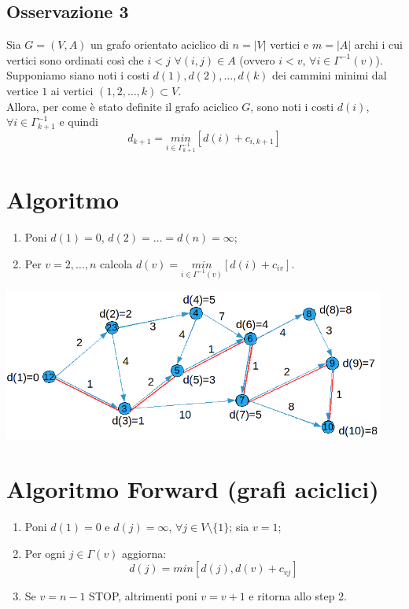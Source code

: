 \subsection{Osservazione 3}
Sia $G=(V,A)$ un grafo orientato aciclico di $n=|V|$ vertici e $m=|A|$ archi i cui vertici sono ordinati così che $i<j$ $\forall(i,j)\in A$ (ovvero $i<v$, $\forall i\in\Gamma^{-1}(v)$).\\
Supponiamo siano noti i costi $d(1),d(2),\dots,d(k)$ dei cammini minimi dal vertice $1$ ai vertici $(1,2,\dots,k)\subset V$.\\
Allora, per come è stato definite il grafo aciclico $G$, sono noti i costi $d(i)$, $\forall i\in\Gamma^{-1}_{k+1}$ e quindi
\begin{equation*}
	d_{k+1}=\underset{i\in\Gamma^{-1}_{k+1}}{min}[d(i)+c_{i,k+1}]
\end{equation*}

\section{Algoritmo}
\begin{enumerate}
	\item Poni $d(1)=0$, $d(2)=\dots=d(n)=\infty$;
	\item Per $v=2,\dots,n$ calcola $d(v)=\underset{i\in\Gamma^{-1}(v)}{min}[d(i)+c_{iv}]$.
\end{enumerate}
\centerline{\includegraphics[height=5cm]{images/graph38.png}}

\section{Algoritmo Forward (grafi aciclici)}
\begin{enumerate}
	\item Poni $d(1)=0$ e $d(j)=\infty$, $\forall j\in V\setminus\{1\}$; sia $v=1$;
	\item Per ogni $j\in\Gamma(v)$ aggiorna:
	\begin{equation*}
		d(j)=min[d(j),d(v)+c_{vj}]
	\end{equation*}
	\item Se $v=n-1$ STOP, altrimenti poni $v=v+1$ e ritorna allo step 2.
\end{enumerate}

